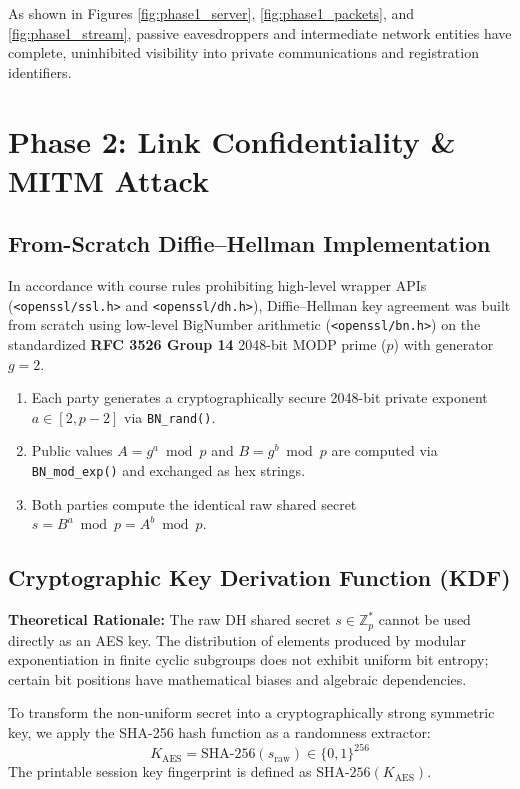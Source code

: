 \documentclass[11pt,a4paper]{article}
\begin{document}
As shown in Figures \ref{fig:phase1_server}, \ref{fig:phase1_packets}, and \ref{fig:phase1_stream}, passive eavesdroppers and intermediate network entities have complete, uninhibited visibility into private communications and registration identifiers.

\section{Phase 2: Link Confidentiality \& MITM Attack}

\subsection{From-Scratch Diffie--Hellman Implementation}
In accordance with course rules prohibiting high-level wrapper APIs (\texttt{<openssl/ssl.h>} and \texttt{<openssl/dh.h>}), Diffie--Hellman key agreement was built from scratch using low-level BigNumber arithmetic (\texttt{<openssl/bn.h>}) on the standardized \textbf{RFC 3526 Group 14} 2048-bit MODP prime ($p$) with generator $g = 2$.

\begin{enumerate}
    \item Each party generates a cryptographically secure 2048-bit private exponent $a \in [2, p-2]$ via \texttt{BN\_rand()}.
    \item Public values $A = g^a \bmod p$ and $B = g^b \bmod p$ are computed via \texttt{BN\_mod\_exp()} and exchanged as hex strings.
    \item Both parties compute the identical raw shared secret $s = B^a \bmod p = A^b \bmod p$.
\end{enumerate}

\subsection{Cryptographic Key Derivation Function (KDF)}
\textbf{Theoretical Rationale:} The raw DH shared secret $s \in \mathbb{Z}_p^*$ cannot be used directly as an AES key. The distribution of elements produced by modular exponentiation in finite cyclic subgroups does not exhibit uniform bit entropy; certain bit positions have mathematical biases and algebraic dependencies. 

To transform the non-uniform secret into a cryptographically strong symmetric key, we apply the SHA-256 hash function as a randomness extractor:
\begin{equation}
    K_{\text{AES}} = \text{SHA-256}(s_{\text{raw}}) \in \{0,1\}^{256}
\end{equation}
The printable session key fingerprint is defined as $\text{SHA-256}(K_{\text{AES}})$.
\end{document}
